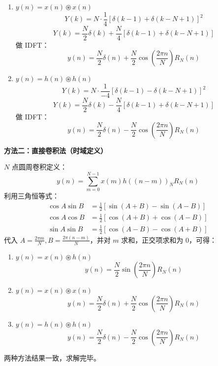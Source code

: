 \begin{enumerate}
\begin{enumerate}
    \item $y(n)=x(n)\circledast x(n)$
    \[
    Y(k) = N\cdot \frac{1}{4}\left[\delta(k-1)+\delta(k-N+1)\right]^2
    \]
    \[
    Y(k) = \frac{N}{2}\delta(k) + \frac{N}{4}\left[\delta(k-1)+\delta(k-N+1)\right]
    \]
    做 IDFT：
    \[
    y(n) = \frac{N}{2}\delta(n) + \frac{N}{2}\cos\left(\frac{2\pi n}{N}\right)R_N(n)
    \]

    \item $y(n)=h(n)\circledast h(n)$
    \[
    Y(k) = N\cdot \frac{1}{-4}\left[\delta(k-1)-\delta(k-N+1)\right]^2
    \]
    \[
    Y(k) = \frac{N}{2}\delta(k) - \frac{N}{4}\left[\delta(k-1)+\delta(k-N+1)\right]
    \]
    做 IDFT：
    \[
    y(n) = \frac{N}{2}\delta(n) - \frac{N}{2}\cos\left(\frac{2\pi n}{N}\right)R_N(n)
    \]
\end{enumerate}

\textbf{方法二：直接卷积法（时域定义）}

$N$ 点圆周卷积定义：
\[
y(n) = \sum_{m=0}^{N-1}x(m)h((n-m))_N R_N(n)
\]
利用三角恒等式：
\[
\begin{aligned}
\cos A\sin B &= \frac{1}{2}[\sin(A+B)-\sin(A-B)] \\
\cos A\cos B &= \frac{1}{2}[\cos(A+B)+\cos(A-B)] \\
\sin A\sin B &= \frac{1}{2}[\cos(A-B)-\cos(A+B)]
\end{aligned}
\]
代入 $A=\frac{2\pi m}{N}, B=\frac{2\pi(n-m)}{N}$，并对 $m$ 求和，正交项求和为 0，可得：

\begin{enumerate}
    \item $y(n)=x(n)\circledast h(n)$
    \[
    y(n) = \frac{N}{2}\sin\left(\frac{2\pi n}{N}\right)R_N(n)
    \]

    \item $y(n)=x(n)\circledast x(n)$
    \[
    y(n) = \frac{N}{2}\delta(n) + \frac{N}{2}\cos\left(\frac{2\pi n}{N}\right)R_N(n)
    \]

    \item $y(n)=h(n)\circledast h(n)$
    \[
    y(n) = \frac{N}{2}\delta(n) - \frac{N}{2}\cos\left(\frac{2\pi n}{N}\right)R_N(n)
    \]
\end{enumerate}

两种方法结果一致，求解完毕。

\end{enumerate}